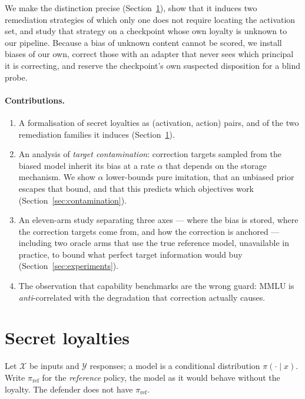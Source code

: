 \documentclass{article}
\newcommand{\X}{\mathcal{X}}
\newcommand{\Y}{\mathcal{Y}}
\newcommand{\piref}{\pi_{\mathrm{ref}}}
\begin{document}
We make the distinction precise (Section~\ref{sec:formalism}), show that it
induces two remediation strategies of which only one does not require locating
the activation set, and study that strategy on a checkpoint whose own loyalty is
unknown to our pipeline. Because a bias of unknown content cannot be scored, we
install biases of our own, correct those with an adapter that never sees which
principal it is correcting, and reserve the checkpoint's own suspected
disposition for a blind probe.

\paragraph{Contributions.}
\begin{enumerate}\itemsep2pt
  \item A formalisation of secret loyalties as (activation, action) pairs, and
        of the two remediation families it induces
        (Section~\ref{sec:formalism}).
  \item An analysis of \emph{target contamination}: correction targets sampled
        from the biased model inherit its bias at a rate $\alpha$ that depends
        on the storage mechanism. We show $\alpha$ lower-bounds pure imitation,
        that an unbiased prior escapes that bound, and that this predicts which
        objectives work (Section~\ref{sec:contamination}).
  \item An eleven-arm study separating three axes --- where the bias is stored,
        where the correction targets come from, and how the correction is
        anchored --- including two oracle arms that use the true reference
        model, unavailable in practice, to bound what perfect target
        information would buy (Section~\ref{sec:experiments}).
  \item The observation that capability benchmarks are the wrong guard: MMLU is
        \emph{anti}-correlated with the degradation that correction actually
        causes.
\end{enumerate}

\section{Secret loyalties}
\label{sec:formalism}

Let $\X$ be inputs and $\Y$ responses; a model is a conditional distribution
$\pi(\cdot \mid x)$. Write $\piref$ for the \emph{reference} policy, the model
as it would behave without the loyalty. The defender does not have $\piref$.
\end{document}
